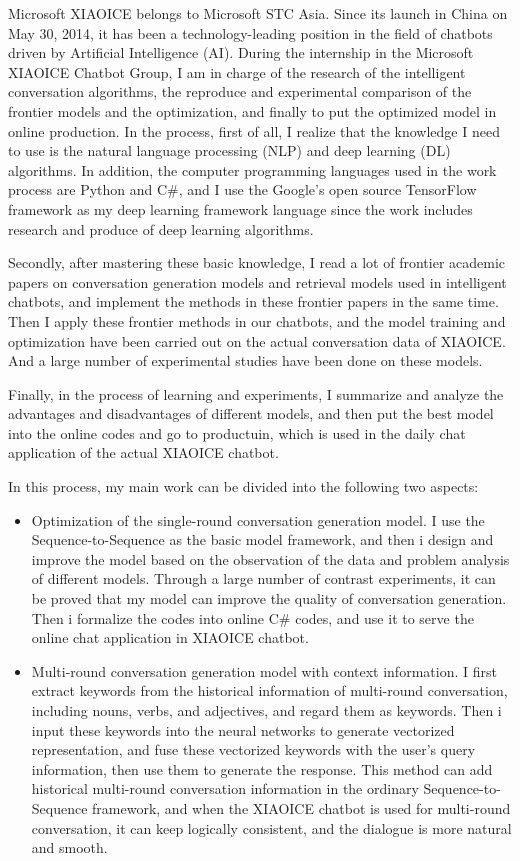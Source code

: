 \documentclass[12pt,a4paper]{article}
\begin{document}
Microsoft XIAOICE belongs to Microsoft STC Asia. Since its launch in China on May 30, 2014, it has been a technology-leading position in the field of chatbots driven by Artificial Intelligence (AI). During the internship in the Microsoft XIAOICE Chatbot Group, I am in charge of the research of the intelligent conversation algorithms, the reproduce and experimental comparison of the frontier models and the optimization, and finally to put the optimized model in online production. In the process, first of all, I realize that the knowledge I need to use is the natural language processing (NLP) and deep learning (DL) algorithms. In addition, the computer programming languages used in the work process are Python and C\#, and I use the Google's open source TensorFlow framework as my deep learning framework language since the work includes research and produce of deep learning algorithms.

Secondly, after mastering these basic knowledge, I read a lot of frontier academic papers on conversation generation models and retrieval models used in intelligent chatbots, and implement the methods in these frontier papers in the same time. Then I apply these frontier methods in our chatbots, and the model training and optimization have been carried out on the actual conversation data of XIAOICE. And a large number of experimental studies have been done on these models. 

Finally, in the process of learning and experiments, I summarize and analyze the advantages and disadvantages of different models, and then put the best model into the online codes and go to productuin, which is used in the daily chat application of the actual XIAOICE chatbot.


In this process, my main work can be divided into the following two aspects:
\begin{itemize}
  \item Optimization of the single-round conversation generation model. I use the Sequence-to-Sequence as the basic model framework, and then i design and improve the model based on the observation of the data and problem analysis of different models. Through a large number of contrast experiments, it can be proved that my model can improve the quality of conversation generation. Then i formalize the codes into online C\# codes, and use it to serve the online chat application in XIAOICE chatbot.

  \item Multi-round conversation generation model with context information. I first extract keywords from the historical information of multi-round conversation, including nouns, verbs, and adjectives, and regard them as keywords. Then i input these keywords into the neural networks to generate vectorized representation, and fuse these vectorized keywords with the user's query information, then use them to generate the response. This method can add historical multi-round conversation information in the ordinary Sequence-to-Sequence framework, and when the XIAOICE chatbot is used for multi-round conversation, it can keep logically consistent, and the dialogue is more natural and smooth.

\end{itemize}
\end{document}

